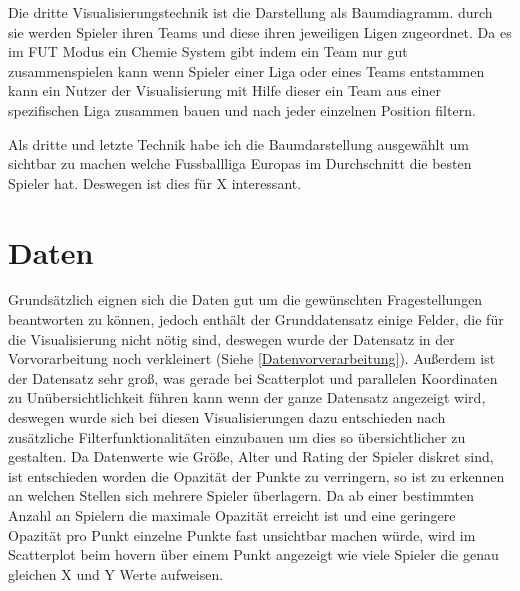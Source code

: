 \documentclass[usegeometry=true]{scrartcl}
\begin{document}
Die dritte Visualisierungstechnik ist die Darstellung als Baumdiagramm. durch sie werden Spieler ihren Teams und diese ihren jeweiligen Ligen zugeordnet. Da es im FUT Modus ein Chemie System gibt indem ein Team nur gut zusammenspielen kann wenn Spieler einer Liga oder eines Teams entstammen kann ein Nutzer der Visualisierung mit Hilfe dieser ein Team aus einer spezifischen Liga zusammen bauen und nach jeder einzelnen Position filtern\cite{heib_fifa_2021}.



Als dritte und letzte Technik habe ich die Baumdarstellung ausgewählt um sichtbar zu machen welche Fussballliga Europas im Durchschnitt die besten Spieler hat. Deswegen ist dies für X interessant.\\
\fi
\section{Daten}


Grundsätzlich eignen sich die Daten gut um die gewünschten Fragestellungen beantworten zu können, jedoch enthält der Grunddatensatz einige Felder, die für die Visualisierung nicht nötig sind, deswegen wurde der Datensatz in der Vorvorarbeitung noch verkleinert (Siehe \ref{Datenvorverarbeitung}). Außerdem ist der Datensatz sehr groß, was gerade bei Scatterplot und parallelen Koordinaten zu Unübersichtlichkeit führen kann wenn der ganze Datensatz angezeigt wird, deswegen wurde sich bei diesen Visualisierungen dazu entschieden nach zusätzliche Filterfunktionalitäten einzubauen um dies so übersichtlicher zu gestalten. Da Datenwerte wie Größe, Alter und Rating der Spieler diskret sind, ist entschieden worden die Opazität der Punkte zu verringern, so ist zu erkennen an welchen Stellen sich mehrere Spieler überlagern. Da ab einer bestimmten Anzahl an Spielern die maximale Opazität erreicht ist und eine geringere Opazität pro Punkt einzelne Punkte fast unsichtbar machen würde, wird im Scatterplot beim hovern über einem Punkt angezeigt wie viele Spieler die genau gleichen  X und Y Werte aufweisen.
\end{document}
